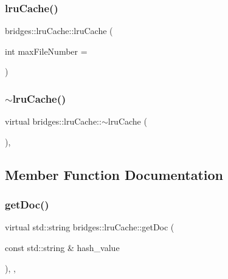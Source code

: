 \subsubsection{\texorpdfstring{lru\+Cache()}{lruCache()}}
{\footnotesize\ttfamily bridges\+::lru\+Cache\+::lru\+Cache (\begin{DoxyParamCaption}\item[{int}]{max\+File\+Number = {} }\end{DoxyParamCaption})\hspace{0.3cm}{\ttfamily [inline]}}

\mbox{\label{classbridges_1_1lru_cache_ab83a0a8e33baeacf9b22e33ea02b3a04}} 
\subsubsection{\texorpdfstring{$\sim$lru\+Cache()}{~lruCache()}}
{\footnotesize\ttfamily virtual bridges\+::lru\+Cache\+::$\sim$lru\+Cache (\begin{DoxyParamCaption}{ }\end{DoxyParamCaption})\hspace{0.3cm}{\ttfamily [virtual]}, {\ttfamily [default]}}



\subsection{Member Function Documentation}
\mbox{\label{classbridges_1_1lru_cache_ac8bed8ab7cbf002a23573c071ba04ad6}} 
\subsubsection{\texorpdfstring{get\+Doc()}{getDoc()}}
{\footnotesize\ttfamily virtual std\+::string bridges\+::lru\+Cache\+::get\+Doc (\begin{DoxyParamCaption}\item[{const std\+::string \&}]{hash\+\_\+value }\end{DoxyParamCaption})\hspace{0.3cm}{\ttfamily [inline]}, {\ttfamily [override]}, {\ttfamily [virtual]}}



